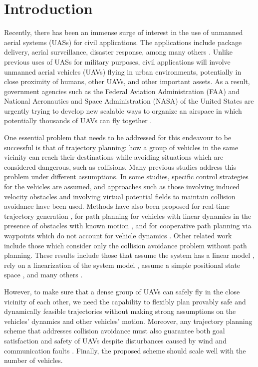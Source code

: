 \section{Introduction \label{sec:introduction}}
Recently, there has been an immense surge of interest in the use of unmanned aerial systems (UASs) for civil applications. The applications include package delivery, aerial surveillance, disaster response, among many others \cite{Tice91, Debusk10, Amazon16, AUVSI16, BBC16}. Unlike previous uses of UASs for military purposes, civil applications will involve unmanned aerial vehicles (UAVs) flying in urban environments, potentially in close proximity of humans, other UAVs, and other important assets. As a result, government agencies such as the Federal Aviation Administration (FAA) and National Aeronautics and Space Administration (NASA) of the United States are urgently trying to develop new scalable ways to organize an airspace in which potentially thousands of UAVs can fly together \cite{FAA13, Kopardekar16}.

One essential problem that needs to be addressed for this endeavour to be successful is that of trajectory planning: how a group of vehicles in the same vicinity can reach their destinations while avoiding situations which are considered dangerous, such as collisions. Many previous studies address this problem under different assumptions. In some studies, specific control strategies for the vehicles are assumed, and approaches such as those involving induced velocity obstacles \cite{Fiorini98, Chasparis05, Vandenberg08,Wu2012} and involving virtual potential fields to maintain collision avoidance \cite{Olfati-Saber2002, Chuang07} have been used. Methods have also been proposed for real-time trajectory generation \cite{Feng-LiLian2002}, for path planning for vehicles with linear dynamics in the presence of obstacles with known motion \cite{Ahmadzadeh2009}, and for cooperative path planning via waypoints which do not account for vehicle dynamics \cite{Bellingham}. Other related work include those which consider only the collision avoidance problem without path planning. These results include those that assume the system has a linear model \cite{Beard2003, Schouwenaars2004, Stipanovic2007}, rely on a linearization of the system model \cite{Massink2001, Althoff2011}, assume a simple positional state space \cite{Lin2015}, and many others \cite{Lalish2008, Hoffmann2008, Chen2016}.

However, to make sure that a dense group of UAVs can safely fly in the close vicinity of each other, we need the capability to flexibly plan provably safe and dynamically feasible trajectories without making strong assumptions on the vehicles' dynamics and other vehicles' motion. Moreover, any trajectory planning scheme that addresses collision avoidance must also guarantee both goal satisfaction and safety of UAVs despite disturbances caused by wind and communication faults \cite{Kopardekar16}. Finally, the proposed scheme should scale well with the number of vehicles.

